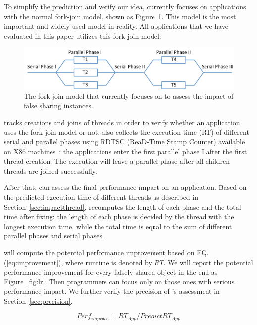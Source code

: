 To simplify the prediction and verify our idea, \cheetah{} currently focuses on applications with the normal fork-join model, shown as Figure~\ref{fig:forkjoinmodel}. This model is the most important and widely used model in reality. All applications that we have evaluated in this paper utilizes this fork-join model. 

\begin{figure}[ht!]
\begin{center}
\includegraphics[width=6in]{figure/forkjoin}
\end{center}
\caption{The fork-join model that \Cheetah{} currently focuses on to assess the impact of false sharing instances. 
\label{fig:forkjoinmodel}}
\end{figure}

\cheetah{} tracks creations and joins of threads in order to verify whether an application uses the fork-join model or not. \Cheetah{} also collects the execution time (RT) of different serial and parallel phases using RDTSC (ReaD-Time Stamp Counter) available on X86 machines~\cite{rtdsc}: the applications enter the first parallel phase I after the first thread creation; The execution will leave a parallel phase after all children threads are joined successfully. 

After that, \cheetah{} can assess the final performance impact on an application. Based on the predicted execution time of different threads as described in Section~\ref{sec:impactthread}, \cheetah{} recomputes the length of each phase and the total time after fixing: the length of each phase is decided by the thread with the longest execution time, while the total time is equal to the sum of different parallel phases and serial phases. 

\cheetah{} will compute the potential performance improvement based on EQ.(\ref{eq:improvement}), where runtime is denoted by $RT$. We will report the potential performance improvement for every falsely-shared object in the end as Figure~\ref{fig:lr}. Then programmers can focus only on those ones with serious performance impact. We further verify the precision of \cheetah{}'s assessment in Section~\ref{sec:precision}.

\begin{equation}
\label{eq:improvement}
Perf_{improve}= RT_{App} / PredictRT_{App}
\end{equation}

